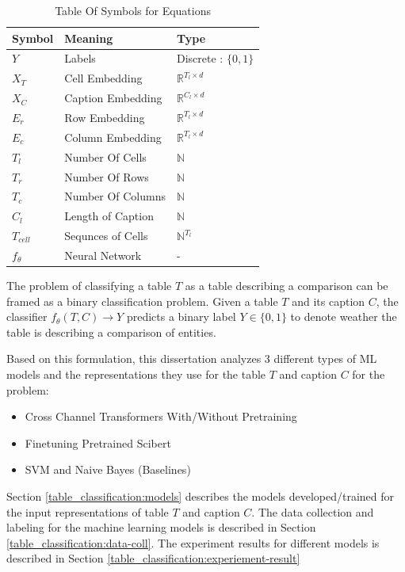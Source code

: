 \begin{table}
    \label{table\arabic{tablecounter}}
    \centering
    \begin{tabular}{|l|l|l|}
        \hline
        Symbol & Meaning & Type \\ \hline
        $Y$ & Labels & Discrete : $\{0,1\}$ \\ \hline
        $X_T$ & Cell Embedding & $\mathbb{R}^{T_l \times d}$\\ \hline
        $X_C$ & Caption Embedding & $\mathbb{R}^{C_l \times d}$ \\ \hline
        $E_r$ & Row Embedding & $\mathbb{R}^{T_l \times d}$ \\ \hline
        $E_c$ & Column Embedding & $\mathbb{R}^{T_l \times d}$ \\ \hline
        $T_l$ & Number Of Cells & $\mathbb{N}$ \\ \hline
        $T_r$ & Number Of Rows & $\mathbb{N}$ \\ \hline
        $T_c$ & Number Of Columns & $\mathbb{N}$ \\ \hline
        $C_l$ & Length of Caption & $\mathbb{N}$ \\ \hline
        $T_{cell}$ & Sequnces of Cells & $\mathbb{N}^{T_l}$ \\ \hline
        $f_\theta$ & Neural Network & - \\ \hline
    \end{tabular}
    \caption{\label{tablecounter} Table Of Symbols for Equations}
\end{table}
The problem of classifying a table $T$ as a table describing a comparison can be framed as a binary classification problem. Given a table $T$ and its caption $C$, the classifier $f_\theta(T,C) \rightarrow Y$ predicts a binary label $Y \in \{0,1\}$ to denote weather the table is describing a comparison of entities. 

Based on this formulation, this dissertation analyzes 3 different types of ML models and the representations they use for the table $T$ and caption $C$ for the problem:
\begin{itemize}
    \item Cross Channel Transformers With/Without Pretraining
    \item Finetuning Pretrained Scibert
    \item SVM and Naive Bayes (Baselines)
\end{itemize}

Section \ref{table_classification:models} describes the models developed/trained for the input representations of table $T$ and caption $C$. The data collection and labeling for the machine learning models is described in Section \ref{table_classification:data-coll}. The experiment results for different models is described in Section \ref{table_classification:experiement-result}

